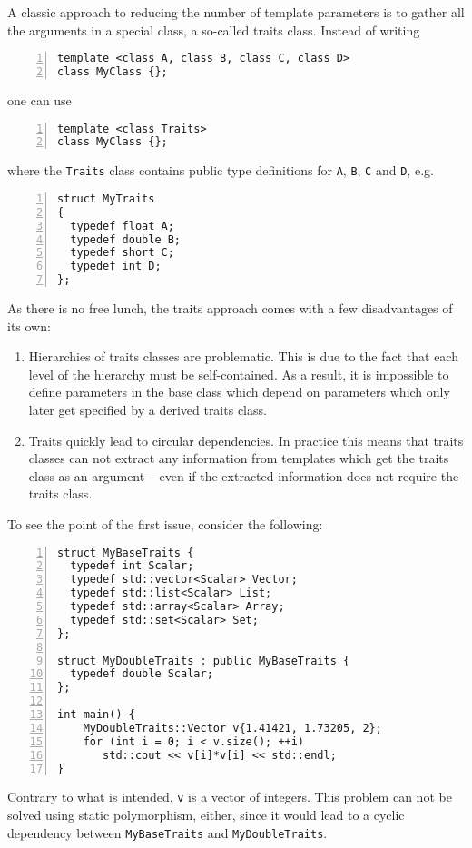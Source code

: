 A classic approach to reducing the number of template parameters is to
gather all the arguments in a special class, a so-called traits
class. Instead of writing
\begin{lstlisting}[basicstyle=\ttfamily\scriptsize,numbers=left,numberstyle=\tiny, numbersep=5pt]
template <class A, class B, class C, class D>
class MyClass {};
\end{lstlisting}
one can use
\begin{lstlisting}[basicstyle=\ttfamily\scriptsize,numbers=left,numberstyle=\tiny, numbersep=5pt]
template <class Traits>
class MyClass {};
\end{lstlisting}
where the \texttt{Traits} class contains public type definitions for
\texttt{A}, \texttt{B}, \texttt{C} and \texttt{D}, e.g.
\begin{lstlisting}[basicstyle=\ttfamily\scriptsize,numbers=left,numberstyle=\tiny, numbersep=5pt]
struct MyTraits
{
  typedef float A;
  typedef double B;
  typedef short C;
  typedef int D;
};
\end{lstlisting}

\noindent
As there is no free lunch, the traits approach comes with a few
disadvantages of its own:
\begin{enumerate}
\item Hierarchies of traits classes are problematic. This is due to
  the fact that each level of the hierarchy must be self-contained. As
  a result, it is impossible to define parameters in the base class
  which depend on parameters which only later get specified by a
  derived traits class.
\item Traits quickly lead to circular dependencies. In practice
  this means that traits classes can not extract any information from
  templates which get the traits class as an argument -- even if the
  extracted information does not require the traits class.
\end{enumerate}

\noindent
To see the point of the first issue, consider the following:
\begin{lstlisting}[basicstyle=\ttfamily\scriptsize,numbers=left,numberstyle=\tiny, numbersep=5pt]
struct MyBaseTraits {
  typedef int Scalar;
  typedef std::vector<Scalar> Vector;
  typedef std::list<Scalar> List;
  typedef std::array<Scalar> Array;
  typedef std::set<Scalar> Set;
};

struct MyDoubleTraits : public MyBaseTraits {
  typedef double Scalar;
};

int main() {
    MyDoubleTraits::Vector v{1.41421, 1.73205, 2};
    for (int i = 0; i < v.size(); ++i)
       std::cout << v[i]*v[i] << std::endl;
}
\end{lstlisting}
Contrary to what is intended, \texttt{v} is a vector of integers. This
problem can not be solved using static polymorphism, either, since it
would lead to a cyclic dependency between \texttt{MyBaseTraits} and
\texttt{MyDoubleTraits}.

